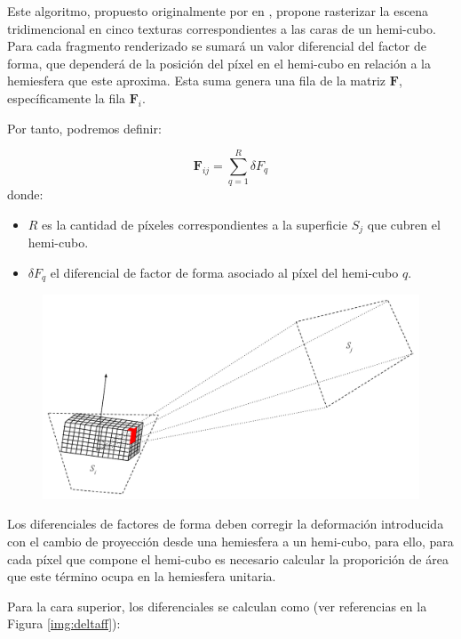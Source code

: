 Este algoritmo, propuesto originalmente por \citeauthor{Cohen} en \citeyear{Cohen}, propone rasterizar la escena tridimencional en cinco texturas correspondientes a las caras de un hemi-cubo. Para cada fragmento renderizado se sumará un valor diferencial del factor de forma, que dependerá de la posición del píxel en el hemi-cubo en relación a la hemiesfera que este aproxima. Esta suma genera una fila de la matriz $\mathbf{F}$, específicamente la fila $\mathbf{F}_{i}$.

Por tanto, podremos definir:

\begin{equation}
	\mathbf{F}_{ij} = \sum_{q=1}^{R} \delta{F_{q}}
	\label{eq:ffgreenberg}
\end{equation}
donde:
\begin{itemize}
	\item $R$ es la cantidad de píxeles correspondientes a la superficie $S_{j}$ que cubren el hemi-cubo.
	\item $\delta{F_{q}}$ el diferencial de factor de forma asociado al píxel del hemi-cubo $q$.
\end{itemize}

\vspace{5mm}
\begin{figure}[H]
	\centering
	\includegraphics[width=0.8\linewidth]{assets/Hemicube}
	\label{img:ff}
\end{figure}

Los diferenciales de factores de forma deben corregir la deformación introducida con el cambio de proyección desde una hemiesfera a un hemi-cubo, para ello, para cada píxel que compone el hemi-cubo es necesario calcular la proporición de área que este término ocupa en la hemiesfera unitaria.

Para la cara superior, los diferenciales se calculan como (ver referencias en la Figura \ref{img:deltaff}):

